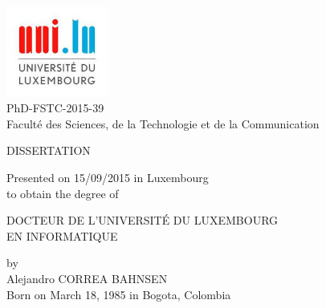
\begin{titlepage}
	\begin{addmargin}[-1cm]{-3cm}
    \begin{center}
        \includegraphics[width=0.25\textwidth]{figures/logo_unilu}\\
        \large
        PhD-FSTC-2015-39\\
        Facult\'{e} des Sciences, de la Technologie et de la Communication \\ \vskip1.5cm

				{\Large \textsc{DISSERTATION}} \\ \vskip1cm

        Presented on 15/09/2015 in Luxembourg\\ \vskip0.25cm
        to obtain the degree of \\ \vskip1cm
        
        {\Large \textsc{DOCTEUR DE L'UNIVERSIT\'{E} DU LUXEMBOURG}}\\ \vskip0.5cm
        {\Large \textsc{EN INFORMATIQUE}}\\ \vskip0.5cm
        
        by \\ \vskip0.5cm
        Alejandro CORREA BAHNSEN \\
        {\small Born on March 18, 1985 in Bogota, Colombia} \\ \vskip2cm
        
        \begingroup
            \Large
             \\ 
						\bigskip
        \endgroup
        \\
        \bigskip
        \vfill
    \end{center}
  \end{addmargin}
\end{titlepage}
